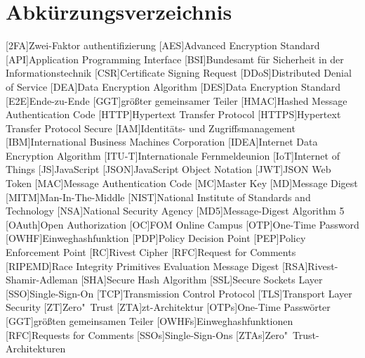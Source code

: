 \section*{Abkürzungsverzeichnis}


\begin{acronym}
[RIPEMD]
    \itemsep0pt %
    [2FA]{Zwei-Faktor \gls{authentifizierung}}
    [AES]{Advanced Encryption Standard}
    [API]{Application Programming Interface}
    [BSI]{Bundesamt für Sicherheit in der Informationstechnik}
    [CSR]{Certificate Signing Request}
    [DDoS]{Distributed Denial of Service}
    [DEA]{Data Encryption Algorithm}
    [DES]{Data Encryption Standard}
    [E2E]{Ende-zu-Ende}
    [GGT]{größter gemeinsamer Teiler}
    [HMAC]{Hashed Message Authentication Code}
    [HTTP]{Hypertext Transfer Protocol}
    [\acs{HTTP}S]{Hypertext Transfer Protocol Secure}
    [IAM]{Identitäts- und Zugriffsmanagement}
    [IBM]{International Business Machines Corporation}
    [IDEA]{Internet Data Encryption Algorithm}
    [ITU-T]{Internationale Fernmeldeunion}
    [IoT]{Internet of Things}
    [JS]{JavaScript}
    [JSON]{JavaScript Object Notation}
    [JWT]{JSON Web Token}
    [MAC]{Message Authentication Code}
    [MC]{Master Key}
    [MD]{Message Digest}
    [MITM]{Man-In-The-Middle}
    [NIST]{National Institute of Standards and Technology}
    [NSA]{National Security Agency}
    [MD5]{Message-Digest Algorithm 5}
    [OAuth]{Open Authorization}
    [OC]{FOM Online Campus}
    [OTP]{One-Time Password}
    [OWHF]{Einweghashfunktion}
    [PDP]{Policy Decision Point}
    [PEP]{Policy Enforcement Point}
    [RC]{Rivest Cipher}
    [RFC]{Request for Comments}
    [RIPEMD]{Race Integrity Primitives Evaluation Message Digest}
    [RSA]{Rivest-Shamir-Adleman}
    [SHA]{Secure Hash Algorithm}
    [SSL]{Secure Sockets Layer}
    [SSO]{Single-Sign-On}
    [TCP]{Transmission Control Protocol}
    [TLS]{Transport Layer Security}
    [ZT]{Zero"~Trust}
    [ZTA]{\acl{zt}-Architektur}
    [OTPs]{One-Time Passwörter}
    [GGT]{größten gemeinsamen Teiler}
    [OWHFs]{Einweghashfunktionen}
    [RFC]{Requests for Comments}
    [SSOs]{Single-Sign-Ons}
    [ZTAs]{Zero"~Trust-Architekturen}
\end{acronym}